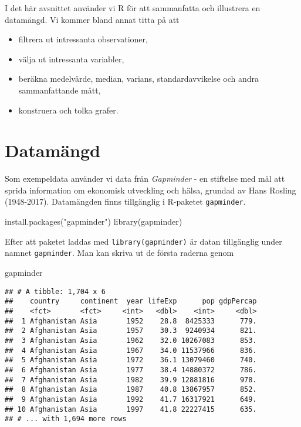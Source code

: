 \documentclass[
]{book}
\newenvironment{Shaded}{\begin{snugshade}}{\end{snugshade}}
\newcommand{\FunctionTok}[1]{\textcolor[rgb]{0.00,0.00,0.00}{#1}}
\newcommand{\NormalTok}[1]{#1}
\newcommand{\StringTok}[1]{\textcolor[rgb]{0.31,0.60,0.02}{#1}}
\providecommand{\tightlist}{%
  \setlength{\itemsep}{0pt}\setlength{\parskip}{0pt}}
\theoremstyle{definition}
\theoremstyle{definition}
\theoremstyle{definition}
\theoremstyle{definition}
\theoremstyle{remark}
\begin{document}
I det här avsnittet använder vi R för att sammanfatta och illustrera en datamängd. Vi kommer bland annat titta på att

\begin{itemize}
\tightlist
\item
  filtrera ut intressanta observationer,
\item
  välja ut intressanta variabler,
\item
  beräkna medelvärde, median, varians, standardavvikelse och andra sammanfattande mått,
\item
  konstruera och tolka grafer.
\end{itemize}

\hypertarget{datamuxe4ngd}{%
\section{Datamängd}\label{datamuxe4ngd}}

Som exempeldata använder vi data från \emph{Gapminder} - en stiftelse med mål att sprida information om ekonomisk utveckling och hälsa, grundad av Hans Rosling (1948-2017). Datamängden finns tillgänglig i R-paketet \texttt{gapminder}.

\begin{Shaded}
\begin{Highlighting}[]
\FunctionTok{install.packages}\NormalTok{(}\StringTok{"gapminder"}\NormalTok{)}
\FunctionTok{library}\NormalTok{(gapminder)}
\end{Highlighting}
\end{Shaded}

Efter att paketet laddas med \texttt{library(gapminder)} är datan tillgänglig under namnet \texttt{gapminder}. Man kan skriva ut de första raderna genom

\begin{Shaded}
\begin{Highlighting}[]
\NormalTok{gapminder}
\end{Highlighting}
\end{Shaded}

\begin{verbatim}
## # A tibble: 1,704 x 6
##    country     continent  year lifeExp      pop gdpPercap
##    <fct>       <fct>     <int>   <dbl>    <int>     <dbl>
##  1 Afghanistan Asia       1952    28.8  8425333      779.
##  2 Afghanistan Asia       1957    30.3  9240934      821.
##  3 Afghanistan Asia       1962    32.0 10267083      853.
##  4 Afghanistan Asia       1967    34.0 11537966      836.
##  5 Afghanistan Asia       1972    36.1 13079460      740.
##  6 Afghanistan Asia       1977    38.4 14880372      786.
##  7 Afghanistan Asia       1982    39.9 12881816      978.
##  8 Afghanistan Asia       1987    40.8 13867957      852.
##  9 Afghanistan Asia       1992    41.7 16317921      649.
## 10 Afghanistan Asia       1997    41.8 22227415      635.
## # ... with 1,694 more rows
\end{verbatim}
\end{document}
